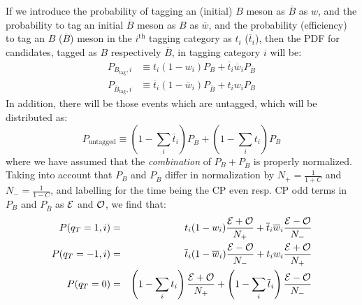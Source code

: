 \documentclass[a4paper,9pt,twoside]{article}
\begin{document}
If we introduce the probability of tagging an (initial) $B$ meson as $\overline{B}$ as $w$, and
the probability to tag an initial $\overline{B}$ meson as $B$ as $\overline{w}$, and the probability
(efficiency) to tag an $B$ ($\overline{B}$) meson in the $i^\mathrm{th}$ tagging category as $t_i$ ($\overline{t}_i$), then the
PDF for candidates, tagged as $B$ respectively $\overline{B}$, in tagging category $i$ will be:
\begin{eqnarray}
   P_{B_\mathrm{tag},i} &\equiv t_i (1-w_i) P_{B} + \overline{t}_i\overline{w}_i P_{\overline{ B} }\\
   P_{\overline{B}_\mathrm{tag},i} &\equiv \overline{t}_i (1-\overline{w}_i) P_{\overline{B}} + t_i w_i P_{ B }
\end{eqnarray} 
In addition, there will be those events which are untagged, which will be distributed as:
\begin{equation}
   P_{\mathrm{untagged}} \equiv \left( 1-\sum_i \overline{t}_i \right)  P_{\overline{B}} + \left( 1 - \sum_i t_i \right)  P_{ B }
\end{equation}
where we have assumed that the {\em combination} of $P_{B}+P_{\overline{B}}$ is properly normalized.
Taking into account that $P_{B}$ and $P_{\overline{B}}$ differ in normalization by
$N_+=\frac{1}{1+C}$ and $N_-=\frac{1}{1-C}$, and labelling for the time being the CP even 
resp. CP odd terms in $P_{B}$ and $P_{\overline{B}}$ as ${\cal E}$
and ${\cal O}$, we find that:
\begin{eqnarray}
   P(q_T=1,i) &=& t_i(1-w_i)\frac{{\cal E} + {\cal O}}{N_+} + \overline{t}_i\overline{w}_i\frac{{\cal E}-{\cal O}}{N_-}  \\
   P(q_T=-1,i) &=& \overline{t}_i(1-\overline{w}_i)\frac{{\cal E} - {\cal O}}{N_-} + t_i w_i\frac{{\cal E}+{\cal O}}{N_+} 
   \\ P(q_T=0) &=& \left(1-\sum_i t_i\right)  \frac{ { \cal E } + {\cal O} }{N_+} + \left(1-\sum_i \overline{t}_i\right)  \frac{ { \cal E} - {\cal O} } { N_- }
\end{eqnarray} 
\end{document}
